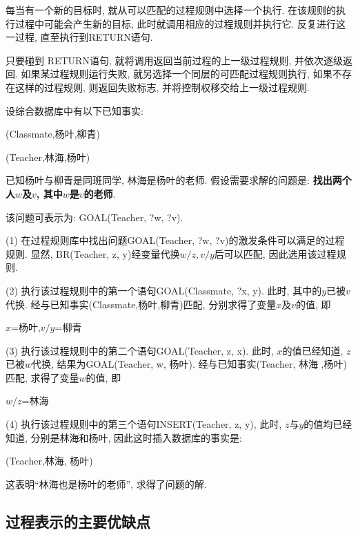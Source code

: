 每当有一个新的目标时, 就从可以匹配的过程规则中选择一个执行. 在该规则的执行过程中可能会产生新的目标, 此时就调用相应的过程规则并执行它. 反复进行这一过程, 直至执行到RETURN语句.

只要碰到 RETURN语句, 就将调用返回当前过程的上一级过程规则, 并依次逐级返回.
如果某过程规则运行失败, 就另选择一个同层的可匹配过程规则执行, 如果不存在这样的过程规则, 则返回失败标志, 并将控制权移交给上一级过程规则.

\begin{example}
设综合数据库中有以下已知事实:
\begin{center}
    (Classmate,杨叶,柳青)

    (Teacher,林海,杨叶)
\end{center}
    已知杨叶与柳青是同班同学, 林海是杨叶的老师. 假设需要求解的问题是: \textbf{找出两个人$w$及$v$, 其中$w$是$v$的老师}.
\end{example}
\begin{answer}
该问题可表示为: GOAL(Teacher, \textcolor[rgb]{0,0,1}{?w, ?v}).

    (1) 在过程规则库中找出问题GOAL(Teacher, ?w, ?v)的激发条件可以满足的过程规则. 显然, BR(Teacher, z, y)经变量代换$w/z, v/y$后可以匹配, 因此选用该过程规则.

    (2) 执行该过程规则中的第一个语句GOAL(Classmate, ?x, y). 此时, 其中的$y$已被$v$代换. 经与已知事实(Classmate,杨叶,柳青)匹配, 分别求得了变量$x$及$v$的值, 即
\begin{center}
    $x$=杨叶,$v/y$=柳青
\end{center}

    (3) 执行该过程规则中的第二个语句GOAL(Teacher, z, x). 此时, $x$的值已经知道, $z$已被$w$代换, 结果为GOAL(Teacher, \textcolor[rgb]{0,0,1}{w, 杨叶}). 经与已知事实(Teacher, 林海 ,杨叶)匹配, 求得了变量$w$的值, 即
\begin{center}
    $w/z$=林海
\end{center}

    (4) 执行该过程规则中的第三个语句INSERT(Teacher, z, y), 此时, $z$与$y$的值均已经知道, 分别是林海和杨叶, 因此这时插入数据库的事实是:
\begin{center}
    (Teacher,林海,   杨叶)
\end{center}
    这表明“林海也是杨叶的老师”, 求得了问题的解.
\end{answer}
\subsection{过程表示的主要优缺点}

